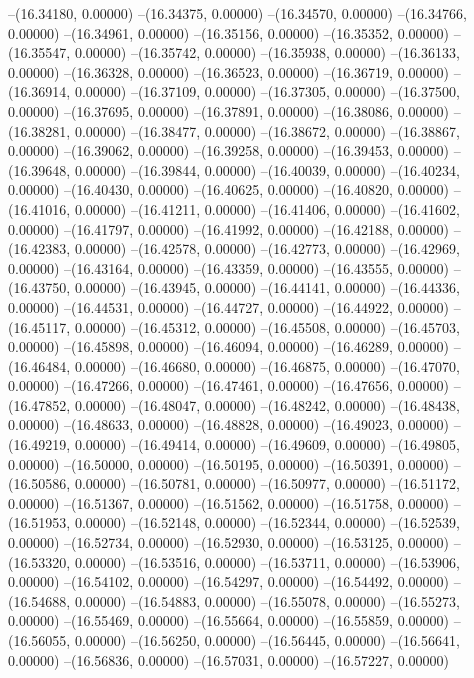 --(16.34180, 0.00000)
--(16.34375, 0.00000)
--(16.34570, 0.00000)
--(16.34766, 0.00000)
--(16.34961, 0.00000)
--(16.35156, 0.00000)
--(16.35352, 0.00000)
--(16.35547, 0.00000)
--(16.35742, 0.00000)
--(16.35938, 0.00000)
--(16.36133, 0.00000)
--(16.36328, 0.00000)
--(16.36523, 0.00000)
--(16.36719, 0.00000)
--(16.36914, 0.00000)
--(16.37109, 0.00000)
--(16.37305, 0.00000)
--(16.37500, 0.00000)
--(16.37695, 0.00000)
--(16.37891, 0.00000)
--(16.38086, 0.00000)
--(16.38281, 0.00000)
--(16.38477, 0.00000)
--(16.38672, 0.00000)
--(16.38867, 0.00000)
--(16.39062, 0.00000)
--(16.39258, 0.00000)
--(16.39453, 0.00000)
--(16.39648, 0.00000)
--(16.39844, 0.00000)
--(16.40039, 0.00000)
--(16.40234, 0.00000)
--(16.40430, 0.00000)
--(16.40625, 0.00000)
--(16.40820, 0.00000)
--(16.41016, 0.00000)
--(16.41211, 0.00000)
--(16.41406, 0.00000)
--(16.41602, 0.00000)
--(16.41797, 0.00000)
--(16.41992, 0.00000)
--(16.42188, 0.00000)
--(16.42383, 0.00000)
--(16.42578, 0.00000)
--(16.42773, 0.00000)
--(16.42969, 0.00000)
--(16.43164, 0.00000)
--(16.43359, 0.00000)
--(16.43555, 0.00000)
--(16.43750, 0.00000)
--(16.43945, 0.00000)
--(16.44141, 0.00000)
--(16.44336, 0.00000)
--(16.44531, 0.00000)
--(16.44727, 0.00000)
--(16.44922, 0.00000)
--(16.45117, 0.00000)
--(16.45312, 0.00000)
--(16.45508, 0.00000)
--(16.45703, 0.00000)
--(16.45898, 0.00000)
--(16.46094, 0.00000)
--(16.46289, 0.00000)
--(16.46484, 0.00000)
--(16.46680, 0.00000)
--(16.46875, 0.00000)
--(16.47070, 0.00000)
--(16.47266, 0.00000)
--(16.47461, 0.00000)
--(16.47656, 0.00000)
--(16.47852, 0.00000)
--(16.48047, 0.00000)
--(16.48242, 0.00000)
--(16.48438, 0.00000)
--(16.48633, 0.00000)
--(16.48828, 0.00000)
--(16.49023, 0.00000)
--(16.49219, 0.00000)
--(16.49414, 0.00000)
--(16.49609, 0.00000)
--(16.49805, 0.00000)
--(16.50000, 0.00000)
--(16.50195, 0.00000)
--(16.50391, 0.00000)
--(16.50586, 0.00000)
--(16.50781, 0.00000)
--(16.50977, 0.00000)
--(16.51172, 0.00000)
--(16.51367, 0.00000)
--(16.51562, 0.00000)
--(16.51758, 0.00000)
--(16.51953, 0.00000)
--(16.52148, 0.00000)
--(16.52344, 0.00000)
--(16.52539, 0.00000)
--(16.52734, 0.00000)
--(16.52930, 0.00000)
--(16.53125, 0.00000)
--(16.53320, 0.00000)
--(16.53516, 0.00000)
--(16.53711, 0.00000)
--(16.53906, 0.00000)
--(16.54102, 0.00000)
--(16.54297, 0.00000)
--(16.54492, 0.00000)
--(16.54688, 0.00000)
--(16.54883, 0.00000)
--(16.55078, 0.00000)
--(16.55273, 0.00000)
--(16.55469, 0.00000)
--(16.55664, 0.00000)
--(16.55859, 0.00000)
--(16.56055, 0.00000)
--(16.56250, 0.00000)
--(16.56445, 0.00000)
--(16.56641, 0.00000)
--(16.56836, 0.00000)
--(16.57031, 0.00000)
--(16.57227, 0.00000)
